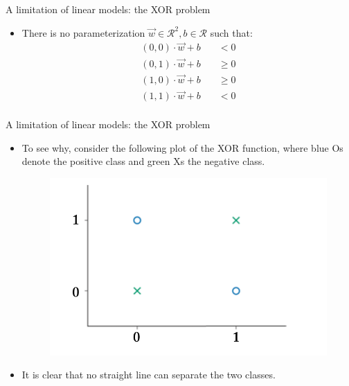 \documentclass[handout]{beamer}
\begin{document}
\begin{frame}{A limitation of linear models: the XOR problem}
\begin{scriptsize}
\begin{itemize}
\item There is no parameterization $\vec{w} \in \mathcal{R}^2, b \in \mathcal{R}$ such that:
\begin{equation}
 \begin{split}
  (0,0) \cdot \vec{w} +b \quad & < 0 \\
  (0,1) \cdot \vec{w} +b \quad & \geq 0 \\
  (1,0) \cdot \vec{w} +b \quad & \geq 0 \\
  (1,1) \cdot \vec{w} +b \quad & < 0 \\
 \end{split}
\end{equation}
\end{itemize}
\end{scriptsize}
\end{frame}



\begin{frame}{A limitation of linear models: the XOR problem}
\begin{scriptsize}
\begin{itemize}
\item To see why, consider the following plot of the XOR function, where blue Os denote the positive class and green Xs the negative class.
\begin{figure}[htb]
	\centering
	 \includegraphics[scale=0.35]{pics/xor.png}
\end{figure}
\item It is clear that no straight line can separate the two classes.
\end{itemize}
\end{scriptsize}
\end{frame}
\end{document}
